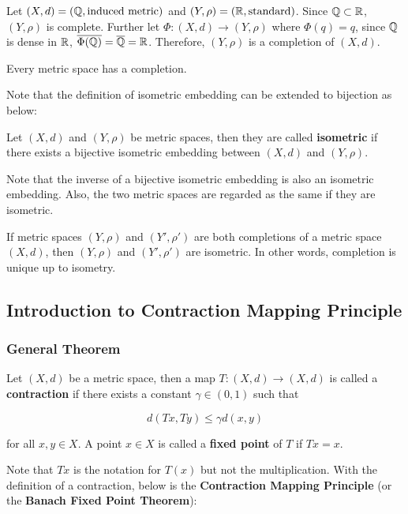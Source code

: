 \documentclass[a4paper,12pt]{article}
\begin{document}
\begin{exm}
  Let $(X,d)=(\mathbb{Q},\text{induced metric})$ and $(Y,\rho)=(\mathbb{R},\text{standard})$. Since $\mathbb{Q}\subset\mathbb{R}$, $(Y,\rho)$ is complete. Further let $\Phi:(X,d)\to(Y,\rho)$ where $\Phi(q)=q$, since $\mathbb{Q}$ is dense in $\mathbb{R}$, $\overline{\Phi(\mathbb{Q})}=\overline{\mathbb{Q}}=\mathbb{R}$. Therefore, $(Y,\rho)$ is a completion of $(X,d)$.
\end{exm}\n

\begin{thm}
  Every metric space has a completion.
\end{thm}\n

Note that the definition of isometric embedding can be extended to bijection as below:\n

\begin{dft}
  Let $(X,d)$ and $(Y,\rho)$ be metric spaces, then they are called \textbf{isometric} if there exists a bijective isometric embedding between $(X,d)$ and $(Y,\rho)$.
\end{dft}\n

Note that the inverse of a bijective isometric embedding is also an isometric embedding. Also, the two metric spaces are regarded as the same if they are isometric.\n

\begin{thm}
  If metric spaces $(Y,\rho)$ and $(Y',\rho')$ are both completions of a metric space $(X,d)$, then $(Y,\rho)$ and $(Y',\rho')$ are isometric. In other words, completion is unique up to isometry.
\end{thm}

\subsection{Introduction to Contraction Mapping Principle}
\subsubsection{General Theorem}
\begin{dft}
  Let $(X,d)$ be a metric space, then a map $T:(X,d)\to (X,d)$ is called a \textbf{contraction} if there exists a constant $\gamma\in(0,1)$ such that
  
  $$d(Tx,Ty)\leq\gamma d(x,y)$$\s

  for all $x,y\in X$. A point $x\in X$ is called a \textbf{fixed point} of $T$ if $Tx=x$.
\end{dft}\n

Note that $Tx$ is the notation for $T(x)$ but not the multiplication. With the definition of a contraction, below is the \textbf{Contraction Mapping Principle} (or the \textbf{Banach Fixed Point Theorem}):\n
\end{document}
